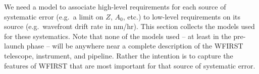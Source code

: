 We need a model to associate high-level requirements for each source of systematic error (e.g.\ a limit on $Z$, $A_0$, etc.) to low-level requirements on its source (e.g.\ wavefront drift rate in nm/hr). This section collects the models used for these systematics. Note that none of the models used -- at least in the pre-launch phase -- will be anywhere near a complete description of the WFIRST telescope, instrument, and pipeline. Rather the intention is to capture the features of WFIRST that are most important for that source of systematic error.

